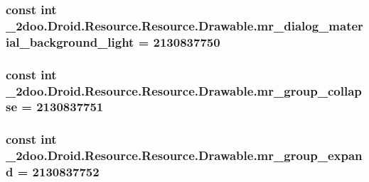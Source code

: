 \hypertarget{class__2doo_1_1_droid_1_1_resource_1_1_drawable_0d4d86d498f5066bfe0bc2dbc11d75b1}{
\subsubsection[{mr\_\-dialog\_\-material\_\-background\_\-light}]{\setlength{\rightskip}{0pt plus 5cm}const int \_\-2doo.Droid.Resource.Resource.Drawable.mr\_\-dialog\_\-material\_\-background\_\-light = 2130837750}}
\label{class__2doo_1_1_droid_1_1_resource_1_1_drawable_0d4d86d498f5066bfe0bc2dbc11d75b1}


\hypertarget{class__2doo_1_1_droid_1_1_resource_1_1_drawable_2d2eafea90d563868a630ba2aeccffaf}{
\subsubsection[{mr\_\-group\_\-collapse}]{\setlength{\rightskip}{0pt plus 5cm}const int \_\-2doo.Droid.Resource.Resource.Drawable.mr\_\-group\_\-collapse = 2130837751}}
\label{class__2doo_1_1_droid_1_1_resource_1_1_drawable_2d2eafea90d563868a630ba2aeccffaf}


\hypertarget{class__2doo_1_1_droid_1_1_resource_1_1_drawable_f4a1f5d99597895a4a03bf7b4ea88208}{
\subsubsection[{mr\_\-group\_\-expand}]{\setlength{\rightskip}{0pt plus 5cm}const int \_\-2doo.Droid.Resource.Resource.Drawable.mr\_\-group\_\-expand = 2130837752}}
\label{class__2doo_1_1_droid_1_1_resource_1_1_drawable_f4a1f5d99597895a4a03bf7b4ea88208}


